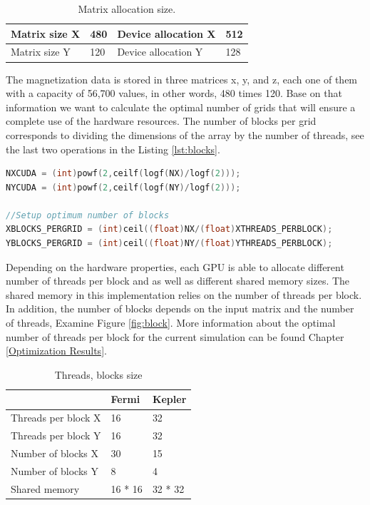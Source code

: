 \begin{table}[h]
\centering
\begin{tabular}{| l | l | l | l | }
\hline
Matrix size X & 480 & Device allocation X & 512\\
\hline
Matrix size Y & 120 & Device allocation Y & 128 \\
\hline
\end{tabular}
\caption{Matrix allocation size.}
\label{tab:cuda}
\end{table}

The magnetization data is stored in three matrices x, y, and z, each one of them with a capacity of 56,700 values, in other words, 480 times 120. Base on that information we want to calculate the optimal number of grids that will ensure a complete use of the hardware resources. The number of blocks per grid corresponds to dividing the dimensions of the array by the number of threads, see the last two operations in the Listing \ref{lst:blocks}.

\begin{lstlisting}[language=C++, label={lst:blocks}, caption={Device capacity calculation and number of block per grid.}]	
NXCUDA = (int)powf(2,ceilf(logf(NX)/logf(2)));
NYCUDA = (int)powf(2,ceilf(logf(NY)/logf(2)));

//Setup optimum number of blocks
XBLOCKS_PERGRID = (int)ceil((float)NX/(float)XTHREADS_PERBLOCK); 
YBLOCKS_PERGRID = (int)ceil((float)NY/(float)YTHREADS_PERBLOCK);
\end{lstlisting}

Depending on the hardware properties, each GPU is able to allocate different number of threads per block and as well as different shared memory sizes. The shared memory in this implementation relies on the number of threads per block. In addition, the number of blocks depends on the input matrix and the number of threads, Examine Figure \ref{fig:block}. More information about the optimal number of threads per block for the current simulation can be found Chapter \ref{Optimization Results}. 

\begin{table}[h]
\centering
\begin{tabular}{| l | l | l |}
\hline
 & Fermi & Kepler \\
\hline
Threads per block X  & 16 & 32 \\
\hline
Threads per block Y  & 16 & 32 \\
\hline
Number of blocks X & 30 & 15 \\
\hline
Number of blocks Y & 8 & 4 \\
\hline
Shared memory & 16 * 16 & 32 * 32 \\
\hline
\end{tabular}
\caption{Threads, blocks size}
\label{tab:threads}
\end{table}


